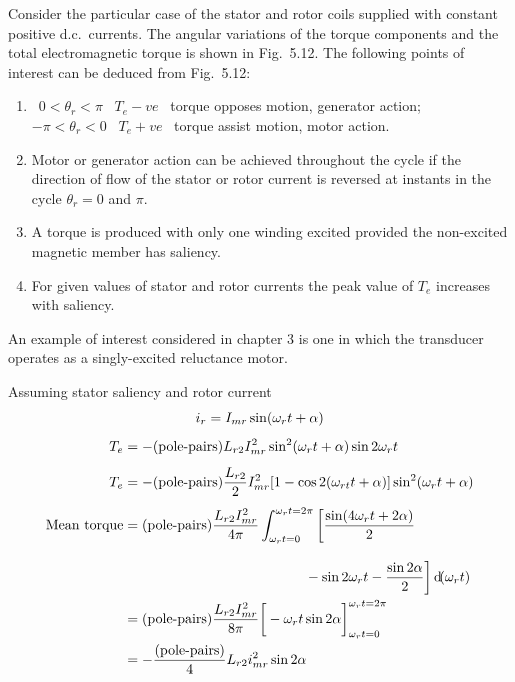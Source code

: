 \documentclass[a4paper,numbers=noenddot,12pt]{scrbook}
\begin{document}
            Consider the particular case of the stator and rotor coils supplied with constant positive d.c.\ currents. The angular variations of the torque components and the total electromagnetic torque is shown in Fig.\ 5.12.
            \TabPositions{2.5cm,4cm}
            The following points of interest can be deduced from Fig.\ 5.12:
            \begin{enumerate}
                \item\ $ 0 < \theta_r < \pi $ \tab\ $T_e - v e$ \tab\ torque opposes motion, generator action;\\
                    $-\pi < \theta_r < 0 $ \tab\ $T_e + v e$ \tab\ torque assist motion, motor action.

                \item Motor or generator action can be achieved throughout the cycle if the direction of flow of the stator or rotor current is reversed at instants in the cycle $\theta_r = 0$ and $\pi$.

                \item A torque is produced with only one winding excited provided the non-excited magnetic member has saliency.

                \item For given values of stator and rotor currents the peak value of $T_e$ increases with saliency.
            \end{enumerate}

            An example of interest considered in chapter 3 is one in which the transducer operates as a singly-excited reluctance motor.

            Assuming stator saliency and rotor current
            \begin{gather*} \label{eq:EqSect5.3}
                i_r = I_{mr} \sin (\omega_r t + \alpha) \\[1ex]
                \begin{aligned}
                    T_e & = -(\text{pole-pairs}) L_{r2} I_{mr}^2 \sin^2(\omega_r t + \alpha) \sin 2 \omega_r t \\[1ex]
                    T_e & = -(\text{pole-pairs}) \frac{L_{r2}}{2} I_{mr}^2 [1 - \cos 2 (\omega_{rt} t + \alpha)] \sin^2(\omega_r t + \alpha) \\[1ex]
                    \text{Mean torque} & = (\text{pole-pairs}) \frac{L_{r2} I_{mr}^2}{4 \pi} \int_{\omega_r t = 0}^{\omega_r t = 2 \pi} \bigg [ \frac{\sin (4 \omega_r t + 2 \alpha)}{2} \\[2ex]
                & \hspace{13em}  -\sin 2 \omega_r t - \frac{\sin 2 \alpha}{2} \bigg ] \dif (\omega_r t) \\
                & = {(\text{pole-pairs})} \frac{L_{r2} I_{mr}^2}{8 \pi} {\bigg [ -\omega_r t \sin 2 \alpha \bigg ]}_{\omega_r t = 0}^{\omega_r t = 2 \pi} \\
                & = - \frac{(\text{pole-pairs})}{4} L_{r2} i_{mr}^2 \sin 2 \alpha
            \end{aligned}
        \end{gather*}
\end{document}

